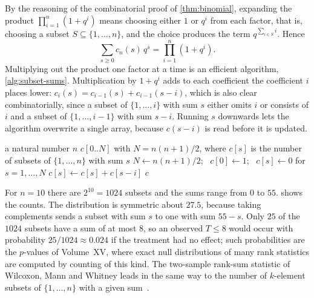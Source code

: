 By the reasoning of the combinatorial proof of \cref{thm:binomial}, expanding the product $\prod_{i=1}^{n}(1+q^i)$ means choosing either $1$ or $q^i$ from each factor, that is, choosing a subset $S\subseteq\{1,\ldots,n\}$, and the choice produces the term $q^{\sum_{i\in S}i}$. Hence
\[
\sum_{s\ge0}c_n(s)\,q^s=\prod_{i=1}^{n}(1+q^i).
\]
Multiplying out the product one factor at a time is an efficient algorithm, \cref{alg:subset-sums}. Multiplication by $1+q^i$ adds to each coefficient the coefficient $i$ places lower: $c_i(s)=c_{i-1}(s)+c_{i-1}(s-i)$, which is also clear combinatorially, since a subset of $\{1,\ldots,i\}$ with sum $s$ either omits $i$ or consists of $i$ and a subset of $\{1,\ldots,i-1\}$ with sum $s-i$. Running $s$ downwards lets the algorithm overwrite a single array, because $c(s-i)$ is read before it is updated.

\begin{algorithm}
\begin{algorithmic}[1]
\Require a natural number $n$
\Ensure $c[0..N]$ with $N=n(n+1)/2$, where $c[s]$ is the number of subsets of $\{1,\ldots,n\}$ with sum $s$
\State $N\gets n(n+1)/2$; \ $c[0]\gets1$; \ $c[s]\gets0$ for $s=1,\ldots,N$
 
   
    \State $c[s]\gets c[s]+c[s-i]$
  \EndFor
\EndFor
\State \Return $c$
\end{algorithmic}
\caption{The coefficients of $\prod_{i=1}^{n}(1+q^i)$. After the pass for $i$, $c[s]$ is the number of subsets of $\{1,\ldots,i\}$ with sum $s$. The algorithm performs $n+\binom{n+1}{3}\approx n^3/6$ additions.}
\label{alg:subset-sums}
\end{algorithm}

For $n=10$ there are $2^{10}=1024$ subsets and the sums range from $0$ to $55$.  shows the counts. The distribution is symmetric about $27.5$, because taking complements sends a subset with sum $s$ to one with sum $55-s$. Only $25$ of the $1024$ subsets have a sum of at most $8$, so an observed $T\le8$ would occur with probability $25/1024\approx0.024$ if the treatment had no effect; such probabilities are the $p$-values of Volume~XV, where exact null distributions of many rank statistics are computed by counting of this kind. The two-sample rank-sum statistic of Wilcoxon, Mann and Whitney leads in the same way to the number of $k$-element subsets of $\{1,\ldots,n\}$ with a given sum~\cite{mannwhitney1947}.

